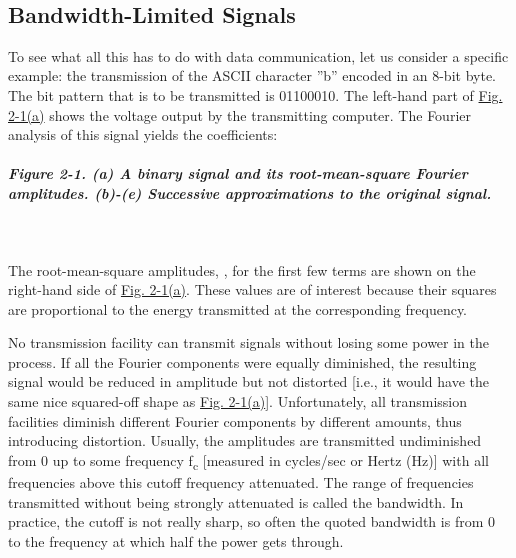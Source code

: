 \documentclass[b5paper,11pt]{memoir}
\begin{document}

~

\protect\hypertarget{0130661023_ch02lev1sec1.htmlux5cux23ch02lev2sec2}{}{}

\subsection{Bandwidth-Limited Signals}

To see what all this has to do with data communication, let us consider
a specific example: the transmission of the ASCII character ''b''
encoded in an 8-bit byte. The bit pattern that is to be transmitted is
01100010. The left-hand part of
\protect\hyperlink{0130661023_ch02lev1sec1.htmlux5cux23ch02fig01}{Fig.
2-1(a)} shows the voltage output by the transmitting computer. The
Fourier analysis of this signal yields the coefficients:

\subparagraph[Figure 2-1. (a) A binary signal and its root-mean-square
Fourier amplitudes. (b)-(e) Successive approximations to the original
signal.]{\texorpdfstring{\protect\hypertarget{0130661023_ch02lev1sec1.htmlux5cux23ch02fig01}{}{}Figure
2-1. (a) A binary signal and its root-mean-square Fourier amplitudes.
(b)-(e) Successive approximations to the original
signal.}{Figure 2-1. (a) A binary signal and its root-mean-square Fourier amplitudes. (b)-(e) Successive approximations to the original signal.}}



~

The root-mean-square amplitudes,
, for the
first few terms are shown on the right-hand side of
\protect\hyperlink{0130661023_ch02lev1sec1.htmlux5cux23ch02fig01}{Fig.
2-1(a)}. These values are of interest because their squares are
proportional to the energy transmitted at the corresponding frequency.

No transmission facility can transmit signals without losing some power
in the process. If all the Fourier components were equally diminished,
the resulting signal would be reduced in amplitude but not distorted
{[}i.e., it would have the same nice squared-off shape as
\protect\hyperlink{0130661023_ch02lev1sec1.htmlux5cux23ch02fig01}{Fig.
2-1(a)}{]}. Unfortunately, all transmission facilities diminish
different Fourier components by different amounts, thus introducing
distortion. Usually, the amplitudes are transmitted undiminished from 0
up to some frequency {f}{\textsubscript{c}} {[}measured in cycles/sec or
Hertz (Hz){]} with all frequencies above this cutoff frequency
attenuated. The range of frequencies transmitted without being strongly
attenuated is called the {bandwidth}. In practice, the cutoff is not
really sharp, so often the quoted bandwidth is from 0 to the frequency
at which half the power gets through.
\end{document}
